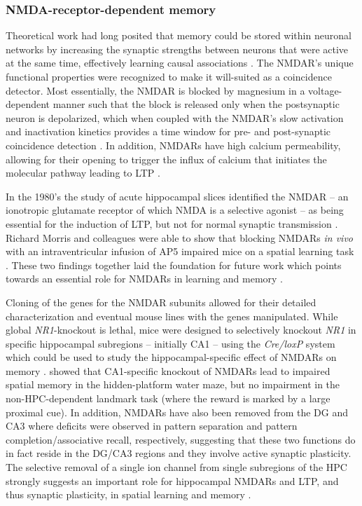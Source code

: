 \subsubsection{NMDA-receptor-dependent memory}
\label{sec:intro:memory:NMDAR}
Theoretical work had long posited that memory could be stored within neuronal networks by increasing the synaptic strengths between neurons that were active at the same time, effectively learning causal associations \citep{Hebb1949, Marr1971}.
The \ac{NMDAR}'s unique functional properties were recognized to make it will-suited as a coincidence detector.
Most essentially, the \ac{NMDAR} is blocked by magnesium in a voltage-dependent manner such that the block is released only when the postsynaptic neuron is depolarized, which when coupled with the \ac{NMDAR}'s slow activation and inactivation kinetics provides a time window for pre- and post-synaptic coincidence detection \citep[reviewed in][]{Bliss1993}.
In addition, \ac{NMDAR}s have high calcium permeability, allowing for their opening to trigger the influx of calcium that initiates the molecular pathway leading to \ac{LTP} \citep{Bailey2008}.

In the 1980's the study of acute hippocampal slices identified the \ac{NMDAR} -- an ionotropic glutamate receptor of which \ac{NMDA} is a selective agonist -- as being essential for the induction of \ac{LTP}, but not for normal synaptic transmission \citep{Collingridge1983}.
Richard Morris and colleagues were able to show that blocking \acs{NMDAR}s \emph{in vivo} with an intraventricular infusion of \ac{AP5} impaired mice on a spatial learning task \citep{Morris1986}.
These two findings together laid the foundation for future work which points towards an essential role for \ac{NMDAR}s in learning and memory \citep{Morris2013}.

Cloning of the genes for the \ac{NMDAR} subunits \citep{Moriyoshi1991} allowed for their detailed characterization and eventual mouse lines with the genes manipulated.
While global \emph{NR1}-knockout is lethal, mice were designed to selectively knockout \emph{NR1} in specific hippocampal subregions -- initially CA1 -- using the \emph{Cre/loxP} system which could be used to study the hippocampal-specific effect of \ac{NMDAR}s on memory \citep{Tsien1996}.
\citeauthor{Tsien1996} showed that CA1-specific knockout of \ac{NMDAR}s lead to impaired spatial memory in the hidden-platform water maze, but no impairment in the non-\acs{HPC}-dependent landmark task (where the reward is marked by a large proximal cue).
In addition, \ac{NMDAR}s have also been removed from the \ac{DG} \citep{McHugh2007} and CA3 \citep{Nakazawa2002} where deficits were observed in pattern separation and pattern completion/associative recall, respectively, suggesting that these two functions do in fact reside in the DG/CA3 regions and they involve active synaptic plasticity.
The selective removal of a single ion channel from single subregions of the \ac{HPC} strongly suggests an important role for hippocampal \ac{NMDAR}s and \ac{LTP}, and thus synaptic plasticity, in spatial learning and memory \citep{Tsien1996}.

